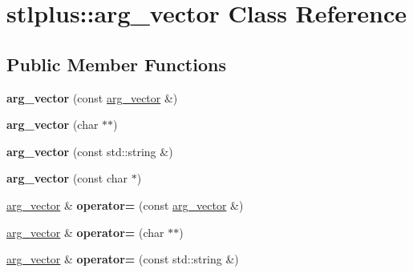 \hypertarget{classstlplus_1_1arg__vector}{}\section{stlplus\+:\+:arg\+\_\+vector Class Reference}
\label{classstlplus_1_1arg__vector}
\subsection*{Public Member Functions}
\begin{DoxyCompactItemize}
\item 
{\bfseries arg\+\_\+vector} (const \hyperlink{classstlplus_1_1arg__vector}{arg\+\_\+vector} \&)\hypertarget{classstlplus_1_1arg__vector_ae17da1beb6657eceae547a0bb77080bf}{}\label{classstlplus_1_1arg__vector_ae17da1beb6657eceae547a0bb77080bf}

\item 
{\bfseries arg\+\_\+vector} (char $\ast$$\ast$)\hypertarget{classstlplus_1_1arg__vector_a6335feedc0c6cea6a91e271f9d777378}{}\label{classstlplus_1_1arg__vector_a6335feedc0c6cea6a91e271f9d777378}

\item 
{\bfseries arg\+\_\+vector} (const std\+::string \&)\hypertarget{classstlplus_1_1arg__vector_a315fc854cdc13e9616d166893d413064}{}\label{classstlplus_1_1arg__vector_a315fc854cdc13e9616d166893d413064}

\item 
{\bfseries arg\+\_\+vector} (const char $\ast$)\hypertarget{classstlplus_1_1arg__vector_ad6e610733d56d68a57c74fe6310d07e7}{}\label{classstlplus_1_1arg__vector_ad6e610733d56d68a57c74fe6310d07e7}

\item 
\hyperlink{classstlplus_1_1arg__vector}{arg\+\_\+vector} \& {\bfseries operator=} (const \hyperlink{classstlplus_1_1arg__vector}{arg\+\_\+vector} \&)\hypertarget{classstlplus_1_1arg__vector_a5b9d285127a6a7df454f11d97e0c1817}{}\label{classstlplus_1_1arg__vector_a5b9d285127a6a7df454f11d97e0c1817}

\item 
\hyperlink{classstlplus_1_1arg__vector}{arg\+\_\+vector} \& {\bfseries operator=} (char $\ast$$\ast$)\hypertarget{classstlplus_1_1arg__vector_a1aa3992d7aeb7dd065a5da696e2f0373}{}\label{classstlplus_1_1arg__vector_a1aa3992d7aeb7dd065a5da696e2f0373}

\item 
\hyperlink{classstlplus_1_1arg__vector}{arg\+\_\+vector} \& {\bfseries operator=} (const std\+::string \&)\hypertarget{classstlplus_1_1arg__vector_a89e98315d0451c585078951712fed4dc}{}\label{classstlplus_1_1arg__vector_a89e98315d0451c585078951712fed4dc}


\end{DoxyCompactItemize}

